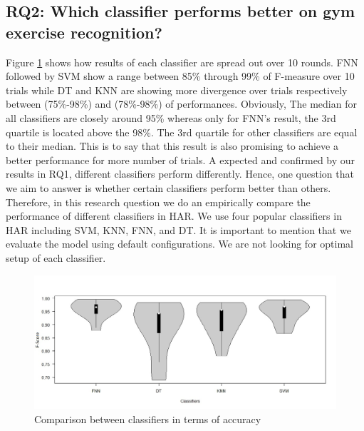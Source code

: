 \documentclass[journal,article,submit,moreauthors,pdftex]{Definitions/mdpi}
\newcommand{\hosein}[1]{\textcolor{orange}{{\it [Hosein: #1]}}}
\begin{document}

\subsection{RQ2: Which classifier performs better on gym exercise recognition?}
Figure \ref{fig:classification_comparison} shows how results of each classifier are spread out over 10 rounds. FNN followed by SVM show a range between 85\% through 99\% of F-measure over 10 trials while DT and KNN are showing more divergence over trials respectively between (75\%-98\%) and (78\%-98\%) of performances. Obviously, The median for all classifiers are closely around 95\% whereas only for FNN's result, the 3rd quartile is located above the 98\%. The 3rd quartile for other classifiers are equal to their median. This is to say that this result is also promising to achieve a better performance for more number of trials.
A expected and confirmed by our results in RQ1, different classifiers perform differently. Hence, one question that we aim to answer is whether certain classifiers perform better than others. Therefore, in this research question we do an empirically compare the performance of different classifiers in HAR. We use four popular classifiers in HAR including SVM, KNN, FNN, and DT. It is important to mention that we evaluate the model using default configurations. We are not looking for optimal setup of each classifier.

\begin{figure}[H]
	\centering
	\includegraphics[width=14 cm]{Definitions/images/boxplot_overall_accuracy_4.jpeg}
	\caption{Comparison between classifiers in terms of accuracy}
	\label{fig:classification_comparison}
\end{figure}
\end{document}
